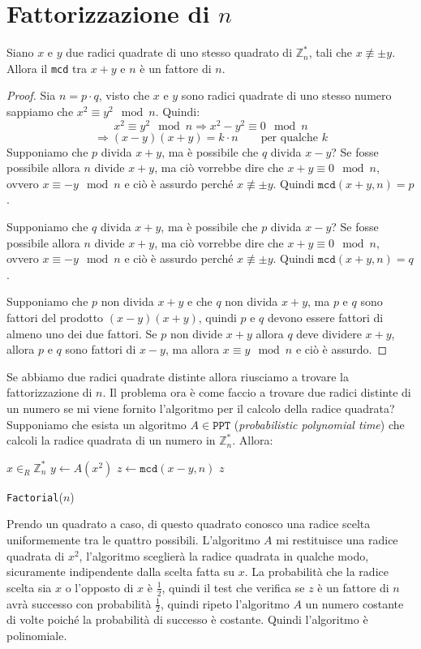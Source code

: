 \section{Fattorizzazione di $n$}
\begin{lemma}
  Siano $x$ e $y$ due radici quadrate di uno stesso quadrato di $\mathbb{Z}_n^*$, tali che 
  $x \not \equiv \pm y$. Allora il \texttt{mcd} tra $x + y$ e $n$ è un fattore di $n$.
\end{lemma}
\begin{proof}
  Sia $n=p\cdot q$, visto che $x$ e $y$ sono radici quadrate di uno stesso numero 
  sappiamo che $x^2 \equiv y^2 \mod n$. Quindi:
  \[
    x^2 \equiv y^2 \mod n \Rightarrow x^2 - y^2 \equiv 0 \mod n 
  \]
  \[
    \Rightarrow (x-y)(x+y) = k \cdot n \qquad \text{per qualche $k$}
  \]
  Supponiamo che $p$ divida $x+y$, ma è possibile che $q$ divida $x-y$?
  Se fosse possibile allora $n$ divide $x +y$, ma ciò vorrebbe dire che $x+y \equiv 0 \mod n$,
  ovvero $x \equiv -y \mod n$ e ciò è assurdo perché $x \not \equiv \pm y$.
  Quindi $\texttt{mcd}(x+y, n) = p$.
  
  Supponiamo che $q$ divida $x+y$, ma è possibile che $p$ divida $x-y$?
  Se fosse possibile allora $n$ divide $x +y$, ma ciò vorrebbe dire che $x+y \equiv 0 \mod n$,
  ovvero $x \equiv -y \mod n$ e ciò è assurdo perché $x \not \equiv \pm y$.
  Quindi $\texttt{mcd}(x+y, n) = q$.

  Supponiamo che $p$ non divida $x+y$ e che $q$ non divida $x+y$, ma $p$ e $q$ sono 
  fattori del prodotto $(x-y)(x+y)$, quindi $p$ e $q$ devono essere fattori di almeno 
  uno dei due fattori. Se $p$ non divide $x+y$ allora $q$ deve dividere $x+y$, allora 
  $p$ e $q$ sono fattori di $x-y$, ma allora $x \equiv y \mod n$ e ciò è assurdo.
   
\end{proof}
Se abbiamo due radici quadrate distinte allora riusciamo a trovare la fattorizzazione di $n$. Il 
problema ora è come faccio a trovare due radici distinte di un numero se mi viene fornito l'algoritmo 
per il calcolo della radice quadrata?
Supponiamo che esista un algoritmo $A\in \texttt{PPT}$ (\textit{probabilistic polynomial time})
che calcoli la radice quadrata di un numero in $\mathbb{Z}_n^*$. Allora:
\begin{algorithmic}[1]
    \State $x \in_R \mathbb{Z}_n^*$
    \State $y \gets A(x^2)$
    \State $z \gets \texttt{mcd}(x-y, n)$
      \Return $z$
    \Else

      \Return \texttt{Factorial}($n$)
    \EndIf
  \EndProcedure
\end{algorithmic}
Prendo un quadrato a caso, di questo quadrato conosco una radice scelta uniformemente 
tra le quattro possibili. L'algoritmo $A$ mi restituisce una radice quadrata di $x^2$,
l'algoritmo sceglierà la radice quadrata in qualche modo, sicuramente indipendente dalla 
scelta fatta su $x$. La probabilità che la radice scelta sia $x$ o l'opposto di $x$ è
$\frac{1}{2}$, quindi il test che verifica se $z$ è un fattore di $n$ avrà successo con
probabilità $\frac{1}{2}$, quindi ripeto l'algoritmo $A$ un numero costante di volte
poiché la probabilità di successo è costante. Quindi l'algoritmo è polinomiale.

